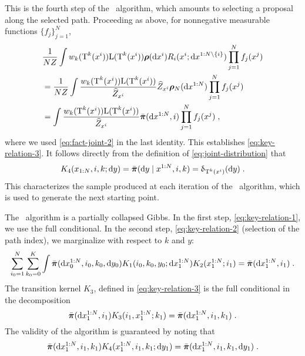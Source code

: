 This is the fourth step of the \IFIS\ algorithm, which amounts to selecting a proposal along the selected path.
Proceeding as above, for nonnegative measurable functions $\{f_j\}_{j=1}^N$,
\begin{align*}
& \frac{1}{N Z} \int w_k(\operatorname{T}^k(x^i)) \mathrm{L}(\operatorname{T}^k(x^i))
\boldsymbol{\rho}(\mathrm{d} x^i) R_i(x^i; \mathrm{d} x^{1:N \setminus \{i\}}) \prod_{j=1}^N f_j(x^j) \\
&= \frac{1}{N Z} \int \frac{w_k(\operatorname{T}^k(x^i)) \mathrm{L}(\operatorname{T}^k(x^i))}{\widehat{Z}_{x^i}}
\widehat{Z}_{x^i} \boldsymbol{\rho}_N(\mathrm{d} x^{1:N})  \prod_{j=1}^N f_j(x^j) \\
&= \int \frac{w_k(\operatorname{T}^k(x^i)) \mathrm{L}(\operatorname{T}^k(x^i))}{\widehat{Z}_{x^i}}
\bar{\boldsymbol{\pi}}(\mathrm{d} x^{1:N},i) \prod_{j=1}^N f_j(x^j)\;,
\end{align*}
where we used \eqref{eq:fact-joint-2} in the last identity. This establishes \eqref{eq:key-relation-3}.
It follows directly from the definition of \eqref{eq:joint-distribution} that
\begin{equation}
\label{eq:key-relation-4}
K_4(x_{1:N},i,k;\mathrm{d} y)= \bar{\boldsymbol{\pi}}(\mathrm{d} y \mid x^{1:N},i,k)= \updelta_{\operatorname{T}^k(x^i)}(\mathrm{d} y) \;.
\end{equation}
This characterizes the sample produced at each iteration of the \IFIS\ algorithm, which is used to generate the next starting point.

The \IFIS\ algorithm is a partially collapsed Gibbs. In the first step, \eqref{eq:key-relation-1}, we use the full conditional. In the second step, \eqref{eq:key-relation-2} (selection of the path index), we marginalize with respect to $k$ and $y$:
\[
\sum_{i_0=1}^N \sum_{k_0=0}^K \int \bar{\boldsymbol{\pi}}(\mathrm{d} x_0^{1:N},i_0,k_0,\mathrm{d} y_0)
K_1(i_0,k_0,y_0;\mathrm{d} x_1^{1:N}) K_2(x_1^{1:N};i_1)= \bar{\boldsymbol{\pi}}(\mathrm{d} x_1^{1:N},i_1) \;.
\]
The transition kernel $K_3$, defined in \eqref{eq:key-relation-3} is the full conditional in the decomposition
\[
\bar{\boldsymbol{\pi}}(\mathrm{d} x_1^{1:N},i_1) K_3(i_1,x_1^{1:N};k_1)= \bar{\boldsymbol{\pi}}(\mathrm{d} x_1^{1:N},i_1,k_1) \;.
\]
The validity of the algorithm is guaranteed by noting that
\[
\bar{\boldsymbol{\pi}}(\mathrm{d} x_1^{1:N},i_1,k_1) K_4(x_1^{1:N},i_1,k_1; \mathrm{d} y_1)=
\bar{\boldsymbol{\pi}}(\mathrm{d} x_1^{1:N},i_1,k_1, \mathrm{d} y_1) \;.
\]
